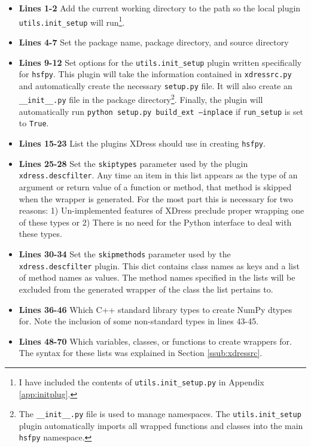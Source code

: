   \begin{itemize}
    \item \textbf{Lines 1-2} Add the current working directory to the path so the local plugin \texttt{utils.init\_setup} will run\footnote{I have included the contents of \texttt{utils.init\_setup.py} in Appendix \ref{app:initplug}.}.
    \item \textbf{Lines 4-7} Set the package name, package directory, and source directory
    \item \textbf{Lines 9-12} Set options for the \texttt{utils.init\_setup} plugin written specifically for \texttt{hsfpy}. This plugin will take the information contained in \texttt{xdressrc.py} and automatically create the necessary \texttt{setup.py} file. It will also create an \texttt{\_\_init\_\_.py} file in the package directory\footnote{The \texttt{\_\_init\_\_.py} file is used to manage namespaces. The \texttt{utils.init\_setup} plugin automatically imports all wrapped functions and classes into the main \texttt{hsfpy} namespace.}. Finally, the plugin will automatically run \texttt{python setup.py build\_ext --inplace} if \texttt{run\_setup} is set to \texttt{True}.
    \item \textbf{Lines 15-23} List the plugins XDress should use in creating \texttt{hsfpy}.
    \item \textbf{Lines 25-28} Set the \texttt{skiptypes} parameter used by the plugin \texttt{xdress.descfilter}. Any time an item in this list appears as the type of an argument or return value of a function or method, that method is skipped when the wrapper is generated. For the most part this is necessary for two reasons: 1) Un-implemented features of XDress preclude proper wrapping one of these types or 2) There is no need for the Python interface to deal with these types.
    \item \textbf{Lines 30-34} Set the \texttt{skipmethods} parameter used by the \texttt{xdress.descfilter} plugin. This dict contains class names as keys and a list of method names as values. The method names specified in the lists will be excluded from the generated wrapper of the class the list pertains to.
    \item \textbf{Lines 36-46} Which C++ standard library types to create NumPy dtypes for. Note the inclusion of some non-standard types in lines 43-45.
    \item \textbf{Lines 48-70} Which variables, classes, or functions to create wrappers for. The syntax for these lists was explained in Section \ref{ssub:xdressrc}.
  \end{itemize}
  \mainstretch{}

